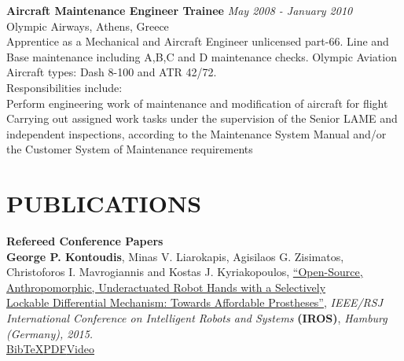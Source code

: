 \documentclass[11pt]{res} %
\begin{document}
\begin{resume}
\small\textbf{Aircraft Maintenance Engineer Trainee} \hfill {\sl May 2008 - January 2010} \\
Olympic Airways, Athens, Greece\\Apprentice as a Mechanical and Aircraft Engineer unlicensed part-66. Line and Base maintenance including A,B,C and D maintenance checks. Olympic Aviation Aircraft types: Dash 8-100 and ATR 42/72.\\
Responsibilities include:\\
 Perform engineering work of maintenance and modification of aircraft for flight\\
 Carrying out assigned work tasks under the supervision of the Senior LAME %
 and independent inspections, according to the Maintenance System Manual and/or the Customer System of Maintenance requirements

\vspace{0.2in} %






\section{PUBLICATIONS}

\vspace{8pt} %

\small\textbf {Refereed Conference Papers}\\\rbrack \hspace{0.1cm} \small\textbf {George P. Kontoudis}, Minas V. Liarokapis, Agisilaos G. Zisimatos, Christoforos I. Mavrogiannis and Kostas J. Kyriakopoulos, \underline{``Open-Source, Anthropomorphic, Underactuated Robot Hands with a Selectively }\\\underline{Lockable Differential Mechanism: Towards Affordable Prostheses''}, {\it  IEEE/RSJ International Conference on Intelligent Robots and Systems} \small\textbf{(IROS)}, {\it Hamburg (Germany), 2015.}
\\\href{http://www.minasliarokapis.com/Kontoudis2015IROS.bib}
{\lbrack BibTeX\rbrack}\href{http://www.minasliarokapis.com/IROS2015_Kontoudis_AffordableProstheses.pdf}
{\lbrack PDF\rbrack}\href{https://www.youtube.com/watch?v=LoG_JTOIMO4}{\lbrack Video\rbrack}


\end{resume}
\end{document}
